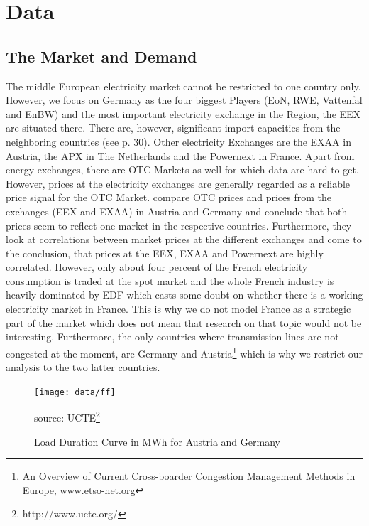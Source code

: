 \section{Data}

\subsection{The Market and Demand}

The middle European electricity market cannot be restricted to one country only. However, we focus on Germany as the four biggest Players (EoN, RWE, Vattenfal and EnBW) and the most important electricity exchange in the Region, the EEX are situated there. There are, however, significant import capacities from the neighboring countries (see \cite{Ellersdorfer2005}p. 30). Other electricity Exchanges are the EXAA in Austria, the APX in The Netherlands and the Powernext in France. Apart from energy exchanges, there are OTC Markets as well for which data are hard to get. However, prices at the electricity exchanges are generally regarded as a reliable price signal for the OTC Market. \cite{Holler2006} compare OTC prices and prices from the exchanges (EEX and EXAA) in Austria and Germany and conclude that both prices seem to reflect one market in the respective countries. Furthermore, they look at correlations between market prices at the different exchanges and come to the conclusion, that prices at the EEX, EXAA and Powernext are highly correlated. However, only about four percent of the French electricity consumption is traded at the spot market and the whole French industry is heavily dominated by EDF which casts some doubt on whether there is a working electricity market in France. This is why we do not model France as a strategic part of the market which does not mean that research on that topic would not be interesting. Furthermore, the only countries where transmission lines are not congested at the moment, are Germany and Austria\footnote{An Overview of Current Cross-boarder Congestion Management Methods in Europe, www.etso-net.org} which is why we restrict our analysis to the two latter countries.
\begin{figure}[h]
\centering
\texttt{[image: data/ff]}
      \label{fig:ldc}
      \caption{Load Duration Curve in MWh for Austria and Germany}
      source: UCTE\footnote{http://www.ucte.org/}
\end{figure}
